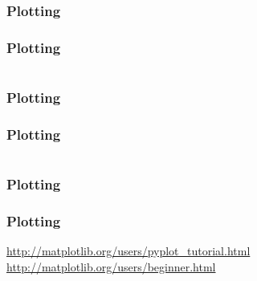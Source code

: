 \documentclass{formation}
\begin{document}
\begin{frame}
  \frametitle{Plotting}
\end{frame}

\begin{frame}
  \frametitle{Plotting}
  \inputminted[linenos,fontsize=\small]{python}{/home/fmg/formations-code-illustration/pyplot_5.py}
\end{frame}

\begin{frame}
  \frametitle{Plotting}
\end{frame}

\begin{frame}
  \frametitle{Plotting}
  \inputminted[linenos,fontsize=\small]{python}{/home/fmg/formations-code-illustration/pyplot_6.py}
\end{frame}

\begin{frame}
  \frametitle{Plotting}
\end{frame}


\begin{frame}
  \frametitle{Plotting}
    \url{http://matplotlib.org/users/pyplot_tutorial.html}
    \url{http://matplotlib.org/users/beginner.html}
\end{frame}
\end{document}

